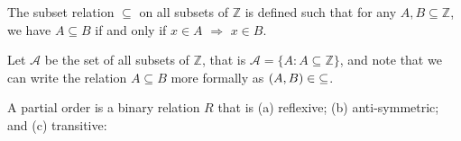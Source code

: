 \documentclass[a4paper,12pt]{article}
\begin{document}

The subset relation $\subseteq$ on all subsets of $\mathbb{Z}$ is defined such that for any $A, B \subseteq \mathbb{Z}$, we have $A \subseteq B$ if and only if $x \in A$ $\Rightarrow$ $x \in B$. 

Let $\mathcal{A}$ be the set of all subsets of $\mathbb{Z}$, that is $\mathcal{A} = \{A : A \subseteq \mathbb{Z}\}$, and note that we can write 
the relation $A \subseteq B$ more formally as $(A,B) \in \hspace{1mm} \subseteq$.

A partial order is a binary relation $R$ that is (a) reflexive; (b) anti-symmetric; and (c) transitive:
\end{document}
